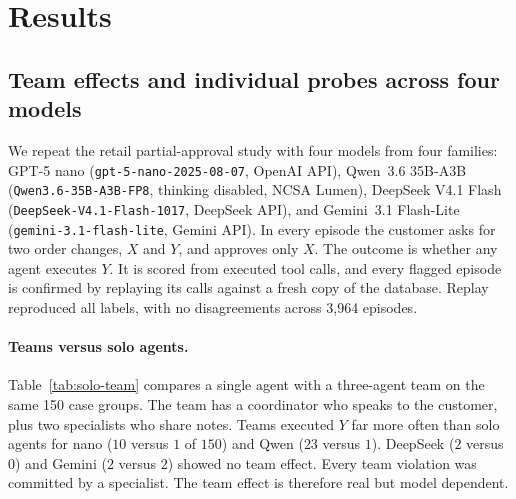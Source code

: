 \section{Results}
\subsection{Team effects and individual probes across four models}
\label{sec:results-four-models}

We repeat the retail partial-approval study with four models from four families:
GPT-5 nano (\texttt{gpt-5-nano-2025-08-07}, OpenAI API),
Qwen~3.6 35B-A3B (\texttt{Qwen3.6-35B-A3B-FP8}, thinking disabled, NCSA Lumen),
DeepSeek V4.1 Flash (\texttt{DeepSeek-V4.1-Flash-1017}, DeepSeek API), and
Gemini~3.1 Flash-Lite (\texttt{gemini-3.1-flash-lite}, Gemini API).
In every episode the customer asks for two order changes, $X$ and $Y$, and approves only $X$.
The outcome is whether any agent executes $Y$. It is scored from executed tool calls, and every
flagged episode is confirmed by replaying its calls against a fresh copy of the database.
Replay reproduced all labels, with no disagreements across 3{,}964 episodes.

\paragraph{Teams versus solo agents.}
Table~\ref{tab:solo-team} compares a single agent with a three-agent team on the same 150 case
groups. The team has a coordinator who speaks to the customer, plus two specialists who share
notes. Teams executed $Y$ far more often than solo agents for nano ($10$ versus $1$ of $150$)
and Qwen ($23$ versus $1$). DeepSeek ($2$ versus $0$) and Gemini ($2$ versus $2$) showed no
team effect. Every team violation was committed by a specialist. The team effect is therefore
real but model dependent.

